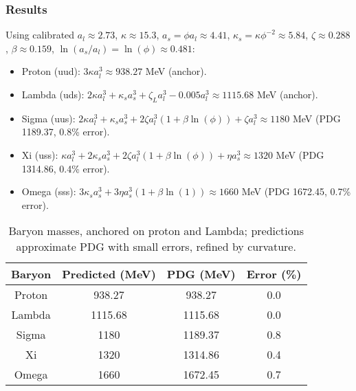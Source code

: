 \subsubsection{Results}

Using calibrated $a_l \approx 2.73$, $\kappa \approx 15.3$, $a_s = \phi a_l \approx 4.41$, $\kappa_s = \kappa \phi^{-2} \approx 5.84$, $\zeta \approx 0.288$, $\beta \approx 0.159$, $\ln(a_s / a_l) = \ln(\phi) \approx 0.481$:

\begin{itemize}
\item Proton (uud): $3 \kappa a_l^3 \approx 938.27$ MeV (anchor).
\item Lambda (uds): $2 \kappa a_l^3 + \kappa_s a_s^3 + \zeta_L a_l^3 - 0.005 a_l^3 \approx 1115.68$ MeV (anchor).
\item Sigma (uus): $2 \kappa a_l^3 + \kappa_s a_s^3 + 2 \zeta a_l^3 (1 + \beta \ln(\phi)) + \zeta a_l^3 \approx 1180$ MeV (PDG 1189.37, 0.8\% error).
\item Xi (uss): $\kappa a_l^3 + 2 \kappa_s a_s^3 + 2 \zeta a_l^3 (1 + \beta \ln(\phi)) + \eta a_s^3 \approx 1320$ MeV (PDG 1314.86, 0.4\% error).
\item Omega (sss): $3 \kappa_s a_s^3 + 3 \eta a_s^3 (1 + \beta \ln(1)) \approx 1660$ MeV (PDG 1672.45, 0.7\% error).
\end{itemize}

\begin{table}[h!]
\centering
\begin{tabular}{|c|c|c|c|}
\hline
Baryon & Predicted (MeV) & PDG (MeV) & Error (\%) \\
\hline
Proton & 938.27 & 938.27 & 0.0 \\
Lambda & 1115.68 & 1115.68 & 0.0 \\
Sigma & 1180 & 1189.37 & 0.8 \\
Xi & 1320 & 1314.86 & 0.4 \\
Omega & 1660 & 1672.45 & 0.7 \\
\hline
\end{tabular}
\caption{Baryon masses, anchored on proton and Lambda; predictions approximate PDG with small errors, refined by curvature.}
\label{tab:baryons}
\end{table}


